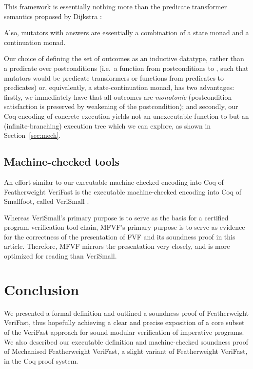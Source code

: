 \documentclass{CSML}
\theoremstyle{definition}\newtheorem{notation}[thm]{Notation}
\theoremstyle{plain}\newtheorem{satz}[thm]{Satz}
\begin{document}
This framework is essentially nothing more than the predicate transformer 
semantics proposed by Dijkstra \cite{weakest-preconditions}:


Also, mutators with answers are essentially a combination of a state monad 
and a continuation monad.

Our choice of defining the set of outcomes as an inductive datatype, 
rather than a predicate over postconditions (i.e.~a function from 
postconditions to , such that mutators would be predicate 
transformers or functions from predicates to predicates) or, equivalently, 
a state-continuation monad, has two advantages: firstly, we immediately 
have that all outcomes are \emph{monotonic} (postcondition satisfaction is 
preserved by weakening of the postcondition); and secondly, our Coq 
encoding of concrete execution yields not an unexecutable function to 
 but an (infinite-branching) execution tree which we can 
explore, as shown in Section~\ref{sec:mech}.

\subsection{Machine-checked tools}

An effort similar to our executable machine-checked encoding into Coq of 
Featherweight VeriFast is the executable machine-checked encoding into Coq 
of Smallfoot, called VeriSmall \cite{verismall}.

Whereas VeriSmall's primary purpose is to serve as the basis for a 
certified program verification tool chain, MFVF's primary purpose is to 
serve as evidence for the correctness of the presentation of FVF and its 
soundness proof in this article. Therefore, MFVF mirrors the presentation 
very closely, and is more optimized for reading than VeriSmall.

\section{Conclusion}\label{sec:conclusion}

We presented a formal definition and outlined a soundness proof of 
Featherweight VeriFast, thus hopefully achieving a clear and precise 
exposition of a core subset of the VeriFast approach for sound modular 
verification of imperative programs. We also described our executable 
definition and machine-checked soundness proof of Mechanised Featherweight 
VeriFast, a slight variant of Featherweight VeriFast, in the Coq proof 
system.
\end{document}
